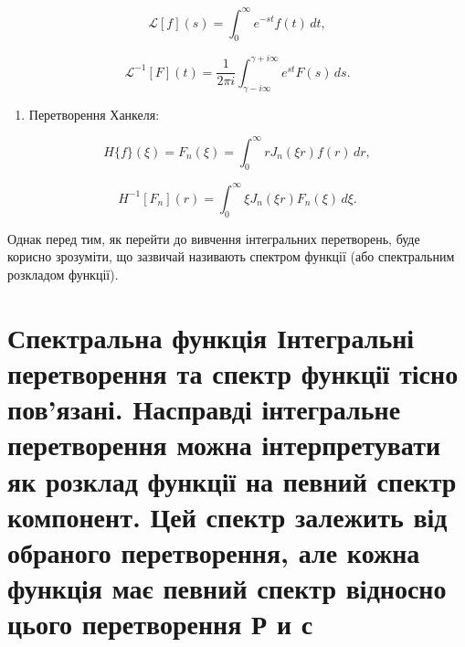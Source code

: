 \documentclass[
  ukrainian,
]{article}
\providecommand{\tightlist}{%
  \setlength{\itemsep}{0pt}\setlength{\parskip}{0pt}}
\begin{document}
\[
\mathcal{L}[f](s) = \int_0^\infty e^{-st}f(t)\,dt,
\]

\[
\mathcal{L}^{-1}[F](t) = \frac{1}{2\pi i}\int_{\gamma-i\infty}^{\gamma+i\infty} e^{st}F(s)\,ds.
\]

\begin{enumerate}
\def\labelenumi{\arabic{enumi}.}
\setcounter{enumi}{6}
\tightlist
\item
  Перетворення Ханкеля:
\end{enumerate}

\[
H\{f\}(\xi) = F_n(\xi) = \int_0^\infty r J_n(\xi r) f(r)\,dr,
\]

\[
H^{-1}[F_n](r) = \int_0^\infty \xi J_n(\xi r) F_n(\xi)\,d\xi.
\]

Однак перед тим, як перейти до вивчення інтегральних перетворень, буде
корисно зрозуміти, що зазвичай називають спектром функції (або
спектральним розкладом функції).

\section{Спектральна функція Інтегральні перетворення та спектр функції
тісно пов'язані. Насправді інтегральне перетворення можна інтерпретувати
як розклад функції на певний спектр компонент. Цей спектр залежить від
обраного перетворення, але кожна функція має певний спектр відносно
цього перетворення Р и
с}\label{ux441ux43fux435ux43aux442ux440ux430ux43bux44cux43dux430-ux444ux443ux43dux43aux446ux456ux44f-ux456ux43dux442ux435ux433ux440ux430ux43bux44cux43dux456-ux43fux435ux440ux435ux442ux432ux43eux440ux435ux43dux43dux44f-ux442ux430-ux441ux43fux435ux43aux442ux440-ux444ux443ux43dux43aux446ux456ux457-ux442ux456ux441ux43dux43e-ux43fux43eux432ux44fux437ux430ux43dux456.-ux43dux430ux441ux43fux440ux430ux432ux434ux456-ux456ux43dux442ux435ux433ux440ux430ux43bux44cux43dux435-ux43fux435ux440ux435ux442ux432ux43eux440ux435ux43dux43dux44f-ux43cux43eux436ux43dux430-ux456ux43dux442ux435ux440ux43fux440ux435ux442ux443ux432ux430ux442ux438-ux44fux43a-ux440ux43eux437ux43aux43bux430ux434-ux444ux443ux43dux43aux446ux456ux457-ux43dux430-ux43fux435ux432ux43dux438ux439-ux441ux43fux435ux43aux442ux440-ux43aux43eux43cux43fux43eux43dux435ux43dux442.-ux446ux435ux439-ux441ux43fux435ux43aux442ux440-ux437ux430ux43bux435ux436ux438ux442ux44c-ux432ux456ux434-ux43eux431ux440ux430ux43dux43eux433ux43e-ux43fux435ux440ux435ux442ux432ux43eux440ux435ux43dux43dux44f-ux430ux43bux435-ux43aux43eux436ux43dux430-ux444ux443ux43dux43aux446ux456ux44f-ux43cux430ux454-ux43fux435ux432ux43dux438ux439-ux441ux43fux435ux43aux442ux440-ux432ux456ux434ux43dux43eux441ux43dux43e-ux446ux44cux43eux433ux43e-ux43fux435ux440ux435ux442ux432ux43eux440ux435ux43dux43dux44f-ux440-ux438-ux441}
\end{document}
